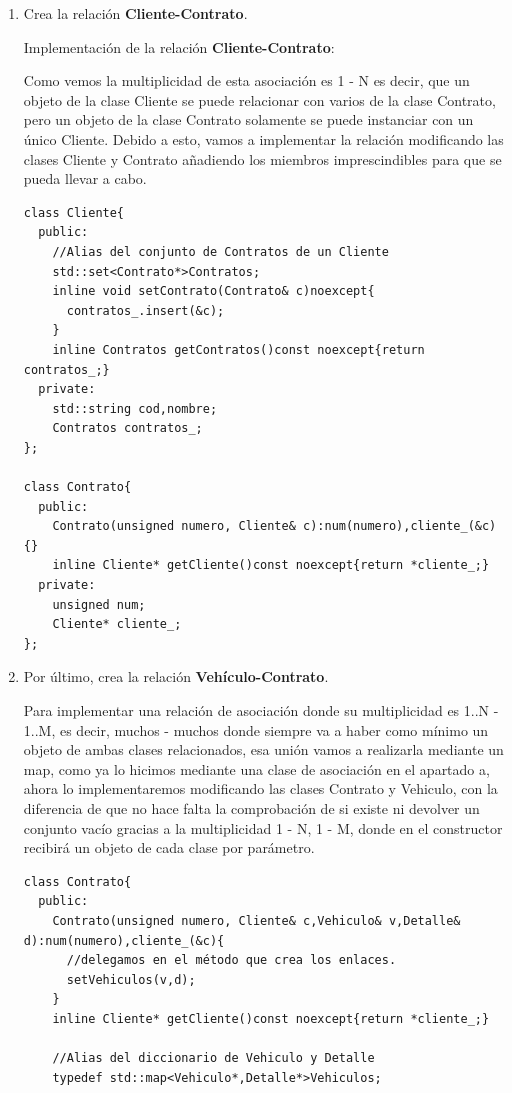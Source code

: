\begin{enumerate}[label =\alph*)]
  \item Crea la relación \textbf{Cliente-Contrato}.

  Implementación de la relación \textbf{Cliente-Contrato}:

  Como vemos la multiplicidad de esta asociación es 1 - N es decir, que un objeto de la clase Cliente se puede relacionar con varios de la clase Contrato, pero un objeto de la clase Contrato solamente se puede instanciar con un único Cliente. Debido a esto, vamos a implementar la relación modificando las clases Cliente y Contrato añadiendo los miembros imprescindibles para que se pueda llevar a cabo.
\begin{verbatim}
class Cliente{
  public:
    //Alias del conjunto de Contratos de un Cliente
    std::set<Contrato*>Contratos;
    inline void setContrato(Contrato& c)noexcept{
      contratos_.insert(&c);
    }
    inline Contratos getContratos()const noexcept{return contratos_;}
  private:
    std::string cod,nombre;
    Contratos contratos_;
};

class Contrato{
  public:
    Contrato(unsigned numero, Cliente& c):num(numero),cliente_(&c){}
    inline Cliente* getCliente()const noexcept{return *cliente_;}
  private:
    unsigned num;
    Cliente* cliente_;
};
\end{verbatim}
\newpage
\item Por último, crea la relación \textbf{Vehículo-Contrato}.
  
  Para implementar una relación de asociación donde su multiplicidad es 1..N - 1..M, es decir, muchos - muchos donde siempre va a haber como mínimo un objeto de ambas clases relacionados, esa unión vamos a realizarla mediante un map, como ya lo hicimos mediante una clase de asociación en el apartado a, ahora lo implementaremos modificando las clases Contrato y Vehiculo, con la diferencia de que no hace falta la comprobación de si existe ni devolver un conjunto vacío gracias a la multiplicidad 1 - N, 1 - M, donde en el constructor recibirá un objeto de cada clase por parámetro.
\begin{verbatim}
class Contrato{
  public:
    Contrato(unsigned numero, Cliente& c,Vehiculo& v,Detalle& d):num(numero),cliente_(&c){
      //delegamos en el método que crea los enlaces.
      setVehiculos(v,d);
    }
    inline Cliente* getCliente()const noexcept{return *cliente_;}

    //Alias del diccionario de Vehiculo y Detalle
    typedef std::map<Vehiculo*,Detalle*>Vehiculos;


\end{verbatim}
\end{enumerate}
